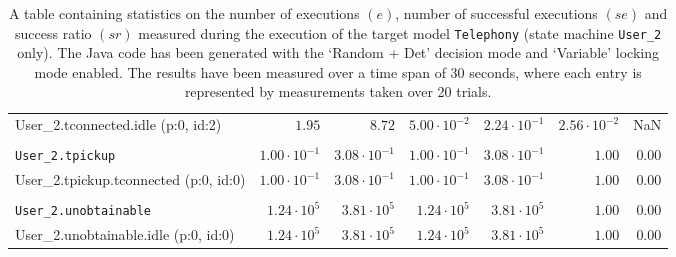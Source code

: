 \begin{table}[htbp]
{\begin{tabular}{lrrrrrr}
\hspace{3mm}User\_2.tconnected.idle (p:0, id:2)       &               $1.95$ &               $8.72$ & $5.00 \cdot 10^{-2}$ & $2.24 \cdot 10^{-1}$ & $2.56 \cdot 10^{-2}$ &                  NaN \\
\\[-8pt]\texttt{User\_2.tpickup}                      & $1.00 \cdot 10^{-1}$ & $3.08 \cdot 10^{-1}$ & $1.00 \cdot 10^{-1}$ & $3.08 \cdot 10^{-1}$ &               $1.00$ &               $0.00$ \\
\hspace{3mm}User\_2.tpickup.tconnected (p:0, id:0)    & $1.00 \cdot 10^{-1}$ & $3.08 \cdot 10^{-1}$ & $1.00 \cdot 10^{-1}$ & $3.08 \cdot 10^{-1}$ &               $1.00$ &               $0.00$ \\
\\[-8pt]\texttt{User\_2.unobtainable}                 &  $1.24 \cdot 10^{5}$ &  $3.81 \cdot 10^{5}$ &  $1.24 \cdot 10^{5}$ &  $3.81 \cdot 10^{5}$ &               $1.00$ &               $0.00$ \\
\hspace{3mm}User\_2.unobtainable.idle (p:0, id:0)     &  $1.24 \cdot 10^{5}$ &  $3.81 \cdot 10^{5}$ &  $1.24 \cdot 10^{5}$ &  $3.81 \cdot 10^{5}$ &               $1.00$ &               $0.00$ \\
\bottomrule
\end{tabular}
}
\caption{A table containing statistics on the number of executions $(e)$, number of successful executions $(se)$ and success ratio $(sr)$ measured during the execution of the target model \texttt{Telephony} (state machine \texttt{User\_2} only). The Java code has been generated with the `Random + Det' decision mode and `Variable' locking mode enabled. The results have been measured over a time span of 30 seconds, where each entry is represented by measurements taken over 20 trials.}
\label{table:frequency_results_telephony_random_det_variable_user_2}
\end{table}